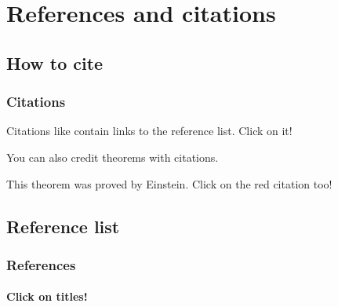 \documentclass{beamer}
\begin{document}
\section{References and citations}

\subsection{How to cite}

\begin{frame}
    \frametitle{Citations}

    Citations like \cite{knuth-fa} contain links to the reference list. Click on it!

    You can also credit theorems with citations.

    \begin{theorem}
        This theorem was proved by Einstein. Click on the red citation too!
    \end{theorem}

\end{frame}

\subsection{Reference list}

\begin{frame}
    \frametitle{References}
    \framesubtitle{Click on titles!}
    \nocite{*}
    \printbibliography[heading=none]
\end{frame}
\end{document}

